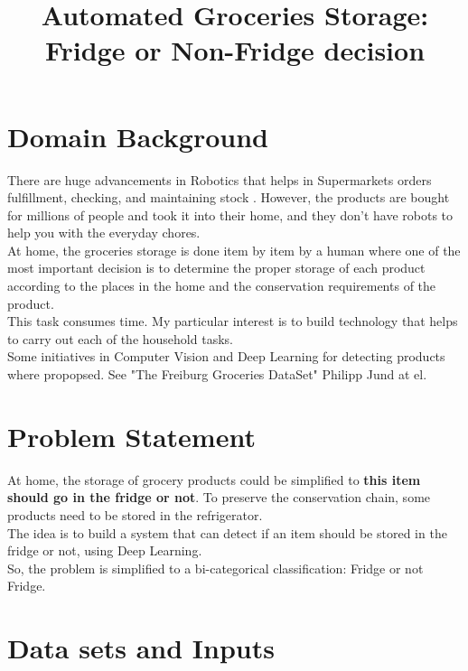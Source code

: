 \documentclass[a4paper,10pt]{article}
\title{Automated Groceries Storage: Fridge or Non-Fridge decision}
\begin{document}
\maketitle 

\section{Domain Background}

There are huge advancements in Robotics that helps in Supermarkets orders fulfillment, checking, and maintaining stock \cite{supermarketrobots} . However, the products are bought for millions of people and took it into their home, and they don't have robots to help you with the everyday chores. \\

At home, the groceries storage is done item by item by a human where one of the most important decision is to determine the proper storage of each product according to the places in the home and the conservation requirements of the product.\\

This task consumes time. My particular interest is to build technology that helps to carry out each of the household tasks. \\

Some initiatives in Computer Vision and Deep Learning for detecting products where propopsed. See "The Freiburg Groceries DataSet" Philipp Jund at el. \cite{freiburgpaper}  

\section{Problem Statement}

At home, the storage of grocery products could be simplified to \textbf{this item should go in the fridge or not}. To preserve the conservation chain, some products need to be stored in the refrigerator.\\

The idea is to build a system that can detect if an item should be stored in the fridge or not, using Deep Learning. \\

So, the problem is simplified to a bi-categorical classification: Fridge or not Fridge. \\


\section{Data sets and Inputs}
\end{document}

